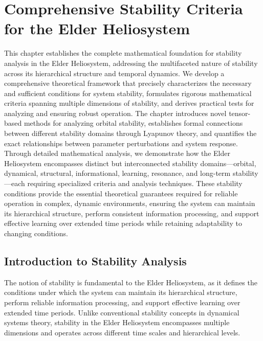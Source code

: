 \chapter{Comprehensive Stability Criteria for the Elder Heliosystem}

\begin{tcolorbox}[colback=DarkSkyBlue!5!white,colframe=DarkSkyBlue!75!black,title=Chapter Summary]
This chapter establishes the complete mathematical foundation for stability analysis in the Elder Heliosystem, addressing the multifaceted nature of stability across its hierarchical structure and temporal dynamics. We develop a comprehensive theoretical framework that precisely characterizes the necessary and sufficient conditions for system stability, formulates rigorous mathematical criteria spanning multiple dimensions of stability, and derives practical tests for analyzing and ensuring robust operation. The chapter introduces novel tensor-based methods for analyzing orbital stability, establishes formal connections between different stability domains through Lyapunov theory, and quantifies the exact relationships between parameter perturbations and system response. Through detailed mathematical analysis, we demonstrate how the Elder Heliosystem encompasses distinct but interconnected stability domains—orbital, dynamical, structural, informational, learning, resonance, and long-term stability—each requiring specialized criteria and analysis techniques. These stability conditions provide the essential theoretical guarantees required for reliable operation in complex, dynamic environments, ensuring the system can maintain its hierarchical structure, perform consistent information processing, and support effective learning over extended time periods while retaining adaptability to changing conditions.
\end{tcolorbox}

\section{Introduction to Stability Analysis}

The notion of stability is fundamental to the Elder Heliosystem, as it defines the conditions under which the system can maintain its hierarchical structure, perform reliable information processing, and support effective learning over extended time periods. Unlike conventional stability concepts in dynamical systems theory, stability in the Elder Heliosystem encompasses multiple dimensions and operates across different time scales and hierarchical levels.

